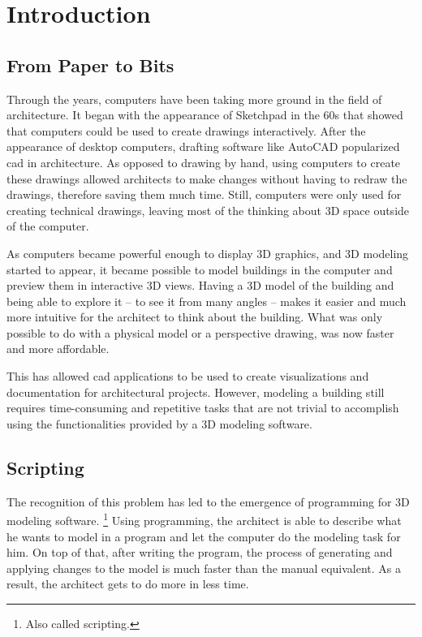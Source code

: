
\chapter{Introduction}
\label{chapter:introduction}


\section{From Paper to Bits}
Through the years, computers have been taking more ground in the field of architecture.
It began with the appearance of Sketchpad\cite{Sutherland:1964:SPM:800265.810742} in the 60s that showed that computers could be used to create drawings interactively.
After the appearance of desktop computers, drafting software like AutoCAD popularized \gls{cad} in architecture.
As opposed to drawing by hand, using computers to create these drawings allowed architects to make changes without having to redraw the drawings, therefore saving them much time.
Still, computers were only used for creating technical drawings, leaving most of the thinking about 3D space outside of the computer.

As computers became powerful enough to display 3D graphics, and 3D modeling started to appear, it became possible to model buildings in the computer and preview them in interactive 3D views.
Having a 3D model of the building and being able to explore it -- to see it from many angles -- makes it easier and much more intuitive for the architect to think about the building.
What was only possible to do with a physical model or a perspective drawing, was now faster and more affordable.

This has allowed \gls{cad} applications to be used to create visualizations and documentation for architectural projects.
However, modeling a building still requires time-consuming and repetitive tasks that are not trivial to accomplish using the functionalities provided by a 3D modeling software.


\section{Scripting}
The recognition of this problem has led to the emergence of programming for 3D modeling software.%
\footnote{Also called scripting.}
Using programming, the architect is able to describe what he wants to model in a program and let the computer do the modeling task for him.
On top of that, after writing the program, the process of generating and applying changes to the model is much faster than the manual equivalent.
As a result, the architect gets to do more in less time.

